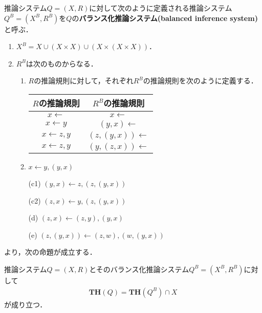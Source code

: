 \begin{define}\label{def5}
推論システム$Q=(X,R)$に対して次のように定義される推論システム$Q^{B}=(X^{B},R^{B})$を$Q$の\textbf{バランス化推論システム(balanced inference system)}と呼ぶ．
\end{define}
\begin{enumerate}
  \item $X^{B}=X\cup(X\times X)\cup(X\times(X\times X))$．
  \item $R^{B}$は次のものからなる．
  \begin{enumerate}
    \item $R$の推論規則に対して，それぞれ$R^{B}$の推論規則を次のように定義する．
    \begin{table}[H]
    \centering
    \begin{tabular}{|c|c|}\hline
      $R$の推論規則 & $R^{B}$の推論規則 \\ \hline\hline
      $x\leftarrow$ & $x\leftarrow$ \\
      $x\leftarrow y$ & $(y,x)\leftarrow$ \\
      $x\leftarrow z,y$ & $(z,(y,x))\leftarrow$ \\
      $x\leftarrow z,y$ & $(y,(z,x))\leftarrow$ \\ \hline
    \end{tabular}
  \end{table}
    \item $x\leftarrow y,(y,x)$
    \item[(c1)] $(y,x)\leftarrow z,(z,(y,x))$
    \item[(c2)] $(z,x)\leftarrow y,(z,(y,x))$
    \item[(d)] $(z,x)\leftarrow (z,y),(y,x)$
    \item[(e)] $(z,(y,x))\leftarrow (z,w),(w,(y,x))$
  \end{enumerate}
\end{enumerate}


\cite{miyano-parallel1993}より，次の命題が成立する．
\begin{proposition}
  推論システム$Q=(X,R)$とそのバランス化推論システム$Q^{B}=(X^{B},R^{B})$に対して
  \begin{eqnarray*}
    \textbf{TH}(Q)=\textbf{TH}(Q^{B})\cap X
  \end{eqnarray*}
  が成り立つ．
\end{proposition}

